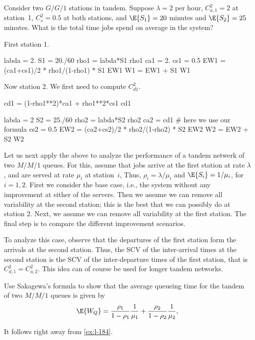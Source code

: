 \begin{exercise}
Consider two $G/G/1$ stations in tandem. Suppose $\lambda=2$ per hour, $C_{a,1}^2=2$ at station~1, $C_s^2=0.5$ at both stations, and $\E{S_1}=20$ minutes and $\E{S_2}=25$ minutes. What is the total time jobs spend on average in the system? 

\begin{solution}
First station 1.
\begin{pyconsole}
labda = 2.
S1 = 20./60
rho1 = labda*S1
rho1
ca1 = 2.
cs1 = 0.5
EW1 = (ca1+cs1)/2 * rho1/(1-rho1) * S1
EW1
W1 = EW1 + S1
W1
\end{pyconsole}

Now station 2. We first need to compute $C_{d1}^2$. 

\begin{pyconsole}
cd1 = (1-rho1**2)*ca1 + rho1**2*cs1
cd1
\end{pyconsole}


\begin{pyconsole}
labda = 2
S2 = 25./60
rho2 = labda*S2
rho2
ca2 = cd1 # here we use our formula
cs2 = 0.5
EW2 = (ca2+cs2)/2 * rho2/(1-rho2) * S2
EW2
W2 = EW2 + S2
W2
\end{pyconsole}


\end{solution}
\end{exercise}




Let us next  apply the above to analyze the performance of a tandem netwerk of two $M/M/1$ queues.
For this, assume that jobs arrive at the first station at rate $\lambda$, and are served at rate $\mu_i$ at station~$i$, Thus, $\rho_i = \lambda/\mu_i$ and $\E{S_i} = 1/\mu_i$, for $i=1,2$.
First we consider the base case, i.e., the system without any improvement at either of the servers.
Then we assume we can remove all variability at the second station; this is the best that we can possibly do at station 2. Next, we assume we can remove all variability at the first station.
The final step is to compare the different improvement scenarios.

To analyze this case, observe that the departures of the first station form the arrivals at the second station.
Thus, the SCV of the inter-arrival times at the second station is the SCV of the inter-departure times of the first station, that is $C_{d,1}^2 = C_{a,2}^2$.
This idea can of course be used for longer tandem networks.



\begin{exercise}
Use Sakagewa's formula to show that the average queueing time for the tandem of two $M/M/1$ queues is given by
\begin{equation}
\E{W_Q} = \frac{\rho_1}{1-\rho_1} \frac1{\mu_1} + \frac{\rho_2}{1-\rho_2} \frac1{\mu_2},
\end{equation}
\begin{solution}
It follows right away from \cref{ex:l-184}.
\end{solution}
\end{exercise}


